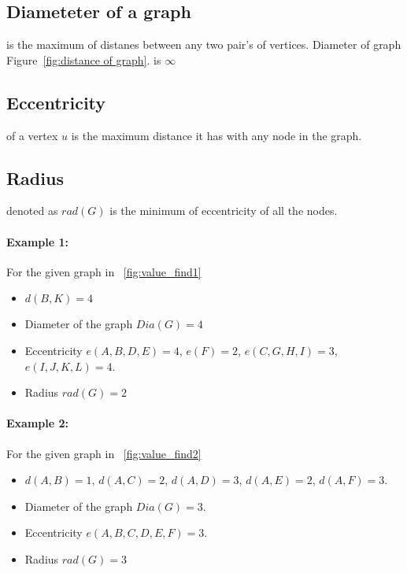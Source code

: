 \subsection{Diameteter of a graph}
is the maximum of distanes between any two pair's of vertices.
Diameter of graph Figure~\ref{fig:distance of graph}. is $\infty$

\subsection{Eccentricity}
of a vertex $u$ is the maximum distance it has with any node in the graph.

\subsection{Radius}
denoted as $rad(G)$ is the minimum of eccentricity of all the nodes.


\paragraph{Example 1:}For the given graph in ~\ref{fig:value_find1}\begin{itemize}
    \item $d(B,K) = 4$
    \item Diameter of the graph $Dia(G) = 4$
    \item Eccentricity $e(A,B,D,E) = 4$, $e(F) = 2$, $e(C,G,H,I) = 3$, $e(I,J,K,L) = 4$.
    \item Radius $rad(G) = 2$ 
\end{itemize}

\paragraph{Example 2:}For the given graph in ~\ref{fig:value_find2} \begin{itemize}
    \item $d(A,B) = 1$, $d(A,C) = 2$, $d(A,D) = 3$, $d(A,E) = 2$, $d(A,F) = 3$. 
    \item Diameter of the graph $Dia(G) = 3$.
    \item Eccentricity $e(A,B,C,D,E,F) = 3$.
    \item Radius $rad(G) = 3$ 
\end{itemize}



